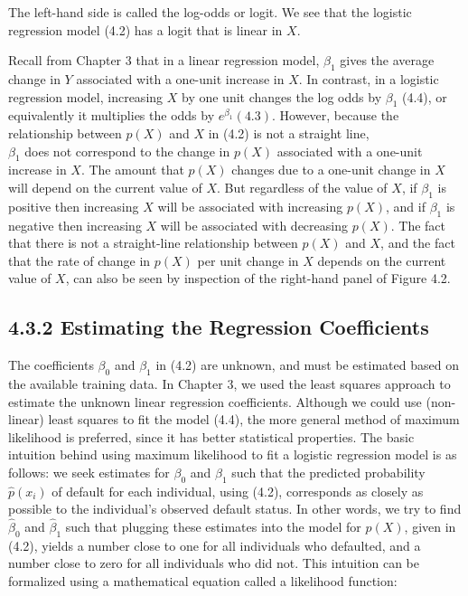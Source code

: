 \documentclass[10pt]{article}
\begin{document}
The left-hand side is called the log-odds or logit. We see that the logistic regression model (4.2) has a logit that is linear in $X$.

Recall from Chapter 3 that in a linear regression model, $\beta_{1}$ gives the average change in $Y$ associated with a one-unit increase in $X$. In contrast, in a logistic regression model, increasing $X$ by one unit changes the log odds by $\beta_{1}$ (4.4), or equivalently it multiplies the odds by $e^{\beta_{1}}(4.3)$. However, because the relationship between $p(X)$ and $X$ in (4.2) is not a straight line,\\
$\beta_{1}$ does not correspond to the change in $p(X)$ associated with a one-unit increase in $X$. The amount that $p(X)$ changes due to a one-unit change in $X$ will depend on the current value of $X$. But regardless of the value of $X$, if $\beta_{1}$ is positive then increasing $X$ will be associated with increasing $p(X)$, and if $\beta_{1}$ is negative then increasing $X$ will be associated with decreasing $p(X)$. The fact that there is not a straight-line relationship between $p(X)$ and $X$, and the fact that the rate of change in $p(X)$ per unit change in $X$ depends on the current value of $X$, can also be seen by inspection of the right-hand panel of Figure 4.2.

\subsection*{4.3.2 Estimating the Regression Coefficients}
The coefficients $\beta_{0}$ and $\beta_{1}$ in (4.2) are unknown, and must be estimated based on the available training data. In Chapter 3, we used the least squares approach to estimate the unknown linear regression coefficients. Although we could use (non-linear) least squares to fit the model (4.4), the more general method of maximum likelihood is preferred, since it has better statistical properties. The basic intuition behind using maximum likelihood to fit a logistic regression model is as follows: we seek estimates for $\beta_{0}$ and $\beta_{1}$ such that the predicted probability $\hat{p}\left(x_{i}\right)$ of default for each individual, using (4.2), corresponds as closely as possible to the individual's observed default status. In other words, we try to find $\hat{\beta}_{0}$ and $\hat{\beta}_{1}$ such that plugging these estimates into the model for $p(X)$, given in (4.2), yields a number close to one for all individuals who defaulted, and a number close to zero for all individuals who did not. This intuition can be formalized using a mathematical equation called a likelihood function:
\end{document}
